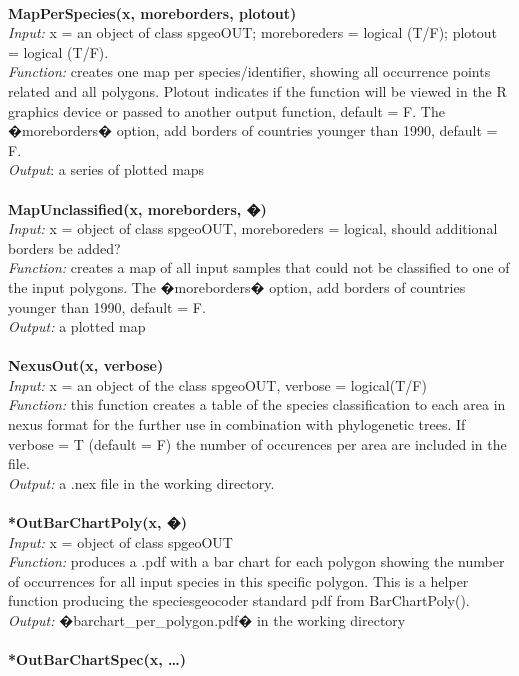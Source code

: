 \documentclass[a4paper,titlepage,11pt]{scrreprt}
\begin{document}
\\
\textbf{MapPerSpecies(x, moreborders, plotout)}\\
\textit{Input:} x = an object of class spgeoOUT; moreboreders = logical (T/F); plotout = logical (T/F).\\
\textit{Function:} creates one map per species/identifier, showing all occurrence points related and all polygons. Plotout indicates if the function will be viewed in the R graphics device or passed to another output function, default = F. The �moreborders� option, add borders of countries younger than 1990, default = F.\\
\textit{Output}: a series of plotted maps\\
\\
\textbf{MapUnclassified(x, moreborders, �)}\\
\textit{Input:} x = object of class spgeoOUT, moreboreders = logical, should additional borders be added?\\
\textit{Function:} creates a map of all input samples that could not be classified to one of the input polygons. The �moreborders� option, add borders of countries younger than 1990, default = F.\\
\textit{Output:} a plotted map\\
\\
\textbf{NexusOut(x, verbose)}\\
\textit{Input:} x = an object of the class spgeoOUT, verbose = logical(T/F)\\
\textit{Function:} this function creates a table of the species classification to each area in nexus format for the further use in combination with phylogenetic trees. If verbose = T (default = F) the number of occurences per area are included in the file.\\
\textit{Output:} a .nex file in the working directory.\\
\\
\textbf{*OutBarChartPoly(x, �)}\\
\textit{Input:} x = object of class spgeoOUT\\
\textit{Function:} produces a .pdf with a bar chart for each polygon showing the  number of occurrences for all input species in this specific polygon. This is a helper function producing the speciesgeocoder standard pdf from BarChartPoly().\\
\textit{Output:} �barchart\_per\_polygon.pdf� in the working directory\\
\\
\textbf{*OutBarChartSpec(x, \dots)}\\
\end{document}
